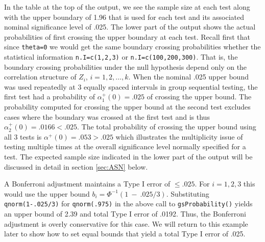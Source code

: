 In the table at the top of the output, we see the sample size at each test along with the upper boundary of 1.96 that is used for each test and its associated nominal significance level of .025. The lower part of the output shows the actual probabilities of first crossing the upper boundary at each test. Recall first that since \texttt{theta=0} we would get the same boundary crossing probabilities whether the statistical information \texttt{n.I=c(1,2,3)} or \texttt{n.I=c(100,200,300)}. That is, the boundary crossing probabilities under the null hypothesis depend only on the correlation structure of $Z_i$, $i=1,2,\ldots,k$. When the nominal .025 upper bound was used repeatedly at 3 equally spaced intervals in group sequential testing, the first test had a probability of $\alpha_1^+(0)=.025$ of crossing the upper bound. The probability computed for crossing the upper bound at the second test excludes cases where the boundary was crossed at the first test and is thus $\alpha_2^+(0)=.0166<.025$. The total probability of crossing the upper bound using all 3 tests is $\alpha^+(0)=.053>.025$ which illustrates the multiplicity issue of testing multiple times at the overall significance level normally specified for a test. The expected sample size indicated in the lower part of the output will be discussed in detail in section \ref{sec:ASN} below.

A Bonferroni adjustment maintains a Type I error of $\leq .025$. For $i=1,2,3$ this would use the upper bound $b_i=\Phi^{-1}(1~-~.025/3)$. Substituting \texttt{qnorm(1-.025/3)} for \texttt{qnorm(.975)} in the above call to \texttt{gsProbability()} yields an upper bound of 2.39 and total Type I error of .0192. Thus, the Bonferroni adjustment is overly conservative for this case. We will return to this example later to show how to set equal bounds that yield a total Type I error of .025.

